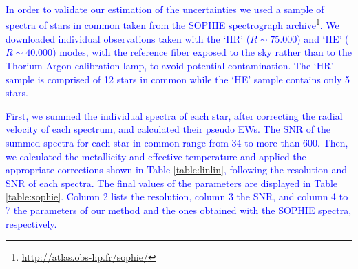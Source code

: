 \documentclass{aa}
\begin{document}
\textcolor{blue}{In order to validate our estimation of the uncertainties we used a sample of spectra of stars in common taken from the SOPHIE spectrograph \citep{Bouchy-2006} archive\footnote{\url{http://atlas.obs-hp.fr/sophie/}}. We downloaded individual observations taken with the `HR' ($R\sim75.000$) and `HE' ($R\sim40.000$) modes, with the reference fiber exposed to the sky rather than to the Thorium-Argon calibration lamp, to avoid potential contamination. The `HR' sample is comprised of 12 stars in common while the `HE' sample contains only 5 stars.} 

\textcolor{blue}{First, we summed the individual spectra of each star, after correcting the radial velocity of each spectrum, and calculated their pseudo EWs. The SNR of the summed spectra for each star in common range from 34 to more than 600. Then, we calculated the metallicity and effective temperature and applied the appropriate corrections shown in Table \ref{table:linlin}, following the resolution and SNR of each spectra. The final values of the parameters are displayed in Table \ref{table:sophie}. Column 2 lists the resolution, column 3 the SNR, and column 4 to 7 the parameters of our method and the ones obtained with the SOPHIE spectra, respectively.} %
\end{document}
